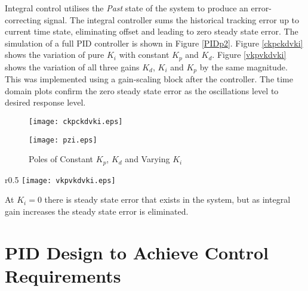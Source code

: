 Integral control utilises the \emph{Past} state of the system to produce
an error-correcting signal. The integral controller sums the historical
tracking error up to current time state, eliminating offset and leading
to zero steady state error. The simulation of a full PID controller is
shown in Figure \ref{PIDp2}. Figure \ref{ckpckdvki} shows the variation
of pure \(K_i\) with constant \(K_p\) and \(K_d\). Figure
\ref{vkpvkdvki} shows the variation of all three gains \(K_d\), \(K_i\)
and \(K_p\) by the same magnitude. This was implemented using a
gain-scaling block after the controller. The time domain plots confirm
the zero steady state error as the oscillations level to desired
response level.

\begin{figure}[h]
\centering
\begin{minipage}{.455\textwidth}
 \centering
 \texttt{[image: ckpckdvki.eps]}
 \caption{Time-Domain Response For Constant $K_p$, $K_d$ and Varying $K_i$}
 \label{ckpckdvki}
\end{minipage}
\hfill
\begin{minipage}{.455\textwidth}
\centering
\texttt{[image: pzi.eps]}
\caption{Poles of Constant $K_p$, $K_d$ and Varying $K_i$}
\label{pzi}
\end{minipage}
\vspace{-20pt}
\end{figure}

\begin{wrapfigure}{r}{0.5\textwidth}
\centering
\vspace{-5pt} %
\texttt{[image: vkpvkdvki.eps]}
\vspace{-10pt}
\caption{Time-Domain Response For Varying $K_p$, $K_d$ and $K_i$}
  \label{vkpvkdvki}
\vspace{-35pt}
\end{wrapfigure}

At \(K_i = 0\) there is steady state error that exists in the system,
but as integral gain increases the steady state error is eliminated.

\section{PID Design to Achieve Control
Requirements}\label{pid-design-to-achieve-control-requirements}

